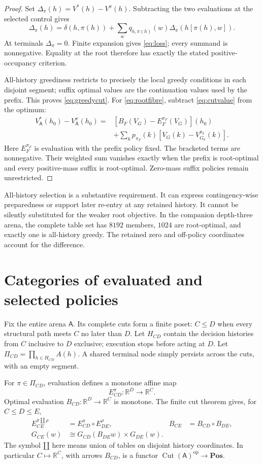 \documentclass[11pt]{article}
\theoremstyle{definition}
\newcommand{\R}{\mathbb R}
\newcommand{\A}{\mathsf A}
\newcommand{\Cut}{\operatorname{Cut}}
\begin{document}
\begin{proof}
Set \(\Delta_\pi(h)=V^*(h)-V^\pi(h)\). Subtracting the two evaluations at
the selected control gives
\[
 \Delta_\pi(h)=\delta(h,\pi(h))+
       \sum_wq_{h,\pi(h)}(w)\Delta_\pi(h[\pi(h),w]).
\]
At terminals \(\Delta_\pi=0\). Finite expansion gives
\eqref{eq:loss}; every summand is nonnegative. Equality at the root
therefore has exactly the stated positive-occupancy criterion.

All-history greediness restricts to precisely the local greedy conditions
in each disjoint segment; suffix optimal values are the continuation values
used by the prefix. This proves \eqref{eq:greedycut}. For
\eqref{eq:rootfibre}, subtract \eqref{eq:cutvalue} from the optimum:
\[
\begin{split}
 V^*_\A(h_0)-V^\pi_\A(h_0)
 ={}&\left[B_F(V_G)-E_F^{\pi_F}(V_G)\right](h_0)\\
 &+\sum_kp_{\pi_F}(k)
       \left[V_G(k)-V_{G_k}^{\pi_k}(k)\right].
\end{split}
\]
Here \(E_F^{\pi_F}\) is evaluation with the prefix policy fixed. The
bracketed terms are nonnegative. Their weighted sum vanishes exactly
when the prefix is root-optimal and every positive-mass suffix is
root-optimal. Zero-mass suffix policies remain unrestricted.
\end{proof}

All-history selection is a substantive requirement. It can express
contingency-wise preparedness or support later re-entry at any retained
history. It cannot be silently substituted for the weaker root objective.
In the companion depth-three arena, the complete table set has \(8192\)
members, \(1024\) are root-optimal, and exactly one is all-history greedy.
The retained zero and off-policy coordinates account for the difference.

\section{Categories of evaluated and selected policies}
\label{sec:categories}
Fix the entire arena \(\A\). Its complete cuts form a finite poset:
\(C\leq D\) when every structural path meets \(C\) no later than \(D\).
Let \(H_{CD}\) contain the decision histories from \(C\) inclusive to
\(D\) exclusive; execution stops before acting at \(D\). Let
\(\Pi_{CD}=\prod_{h\in H_{CD}}A(h)\). A shared terminal node simply
persists across the cuts, with an empty segment.

For \(\pi\in\Pi_{CD}\), evaluation defines a monotone affine map
\[
 E_{CD}^{\pi}:\R^D\longrightarrow\R^C.
\]
Optimal evaluation \(B_{CD}:\R^D\to\R^C\) is monotone. The finite cut
theorem gives, for \(C\leq D\leq E\),
\begin{align}
 E_{CE}^{\pi\amalg\rho}
     &=E_{CD}^{\pi}\circ E_{DE}^{\rho},
       &B_{CE}&=B_{CD}\circ B_{DE}, \label{eq:segmentcomp}\\
 G_{CE}(w)&\cong
       G_{CD}(B_{DE}w)\times G_{DE}(w).
       \label{eq:segmentgreedy}
\end{align}
The symbol \(\amalg\) here means union of tables on disjoint history
coordinates. In particular \(C\mapsto\R^C\), with arrows \(B_{CD}\),
is a functor \(\Cut(\A)^{\mathrm{op}}\to\mathbf{Pos}\).
\end{document}
